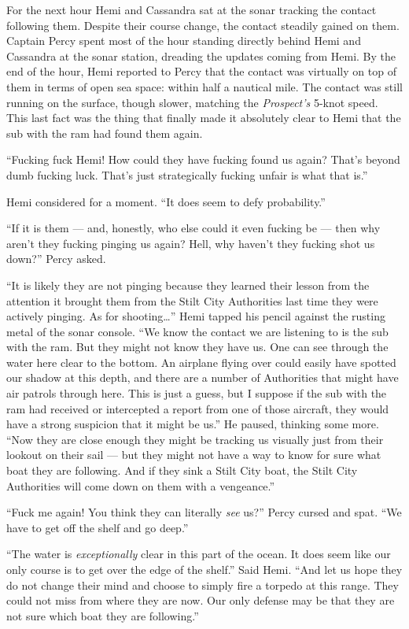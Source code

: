 \documentclass[
]{scrbook}
\begin{document}
For the next hour Hemi and Cassandra sat at the sonar tracking the
contact following them. Despite their course change, the contact
steadily gained on them. Captain Percy spent most of the hour standing
directly behind Hemi and Cassandra at the sonar station, dreading the
updates coming from Hemi. By the end of the hour, Hemi reported to Percy
that the contact was virtually on top of them in terms of open sea
space: within half a nautical mile. The contact was still running on the
surface, though slower, matching the \emph{Prospect's} 5-knot speed.
This last fact was the thing that finally made it absolutely clear to
Hemi that the sub with the ram had found them again.

``Fucking fuck Hemi! How could they have fucking found us again? That's
beyond dumb fucking luck. That's just strategically fucking unfair is
what that is.''

Hemi considered for a moment. ``It does seem to defy probability.''

``If it is them --- and, honestly, who else could it even fucking be ---
then why aren't they fucking pinging us again? Hell, why haven't they
fucking shot us down?'' Percy asked.

``It is likely they are not pinging because they learned their lesson
from the attention it brought them from the Stilt City Authorities last
time they were actively pinging. As for shooting\ldots{}'' Hemi tapped
his pencil against the rusting metal of the sonar console. ``We know the
contact we are listening to is the sub with the ram. But they might not
know they have us. One can see through the water here clear to the
bottom. An airplane flying over could easily have spotted our shadow at
this depth, and there are a number of Authorities that might have air
patrols through here. This is just a guess, but I suppose if the sub
with the ram had received or intercepted a report from one of those
aircraft, they would have a strong suspicion that it might be us.'' He
paused, thinking some more. ``Now they are close enough they might be
tracking us visually just from their lookout on their sail --- but they
might not have a way to know for sure what boat they are following. And
if they sink a Stilt City boat, the Stilt City Authorities will come
down on them with a vengeance.''

``Fuck me again! You think they can literally \emph{see} us?'' Percy
cursed and spat. ``We have to get off the shelf and go deep.''

``The water is \emph{exceptionally} clear in this part of the ocean. It
does seem like our only course is to get over the edge of the shelf.''
Said Hemi. ``And let us hope they do not change their mind and choose to
simply fire a torpedo at this range. They could not miss from where they
are now. Our only defense may be that they are not sure which boat they
are following.''
\end{document}
